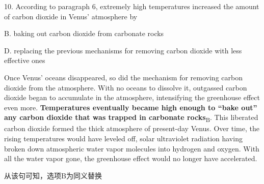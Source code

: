 \begin{blk}
    \begin{qst}
        10. According to paragraph 6, extremely high temperatures increased the amount of carbon dioxide in Venus’ atmosphere by
    \end{qst}

    \begin{chc}
        B. baking out carbon dioxide from carbonate rocks

        D. replacing the previous mechanisms for removing carbon dioxide with less effective ones
    \end{chc}

    \begin{psgq}
        Once Venus’ oceans disappeared, so did the mechanism for removing carbon dioxide from the atmosphere. With no oceans to dissolve it, outgassed carbon dioxide began to accumulate in the atmosphere, intensifying the greenhouse effect even more. \textbf{Temperatures eventually became high enough to “bake out” any carbon dioxide that was trapped in carbonate rocks}\textsubscript{B}. This liberated carbon dioxide formed the thick atmosphere of present-day Venus. Over time, the rising temperatures would have leveled off, solar ultraviolet radiation having broken down atmospheric water vapor molecules into hydrogen and oxygen. With all the water vapor gone, the greenhouse effect would no longer have accelerated.
    \end{psgq}

    \begin{nlz}
        从该句可知，选项B为同义替换
    \end{nlz}
\end{blk}
